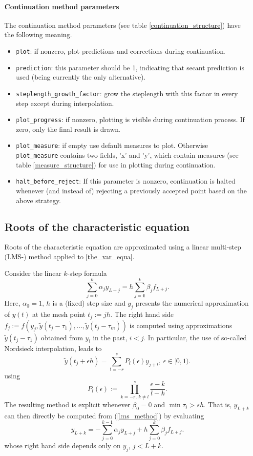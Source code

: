\documentclass[10pt]{scrartcl}
\newcommand{\defeq}{:=}
\newcommand{\blist}[1]{\mbox{\lstinline!#1!}}
\begin{document}
{\paragraph{Continuation method parameters}
The continuation method parameters (see table \ref{continuation_structure})
have the following meaning.
\begin{itemize}
\item \blist{plot}: if nonzero, plot predictions and corrections
during continuation.
\item \blist{prediction}: this parameter should be 1, indicating
that secant prediction is used (being currently the only
alternative).
\item \blist{steplength_growth_factor}: grow the steplength with
this factor in every step except during interpolation.
\item \blist{plot_progress}: if nonzero, plotting is visible during
  continuation process. If zero, only the final result is drawn.
\item \blist{plot_measure}: if empty use default measures to plot.
  Otherwise \blist{plot_measure} contains two fields, 'x' and 'y',
  which contain measures (see table \ref{measure_structure}) for use
  in plotting during continuation.
\item \blist{halt_before_reject}: If this parameter is nonzero,
continuation is halted whenever (and instead of) rejecting a
previously accepted point based on the above strategy.
\end{itemize}

\subsection{Roots of the characteristic equation}\label{root_char_equa_gio_label}
Roots of the characteristic equation are approximated using a linear
multi-step (LMS-) method applied to \eqref{the_var_equa}.

Consider the linear $k$-step formula
\begin{equation}\label{lms_method}
\sum_{j=0}^k\alpha_j y_{L+j}=h\sum_{j=0}^k\beta_j f_{L+j}.
\end{equation}
Here, $\alpha_0=1$, $h$ is a (fixed) step size and 
$y_j$ presents the numerical approximation of $y(t)$ at the mesh
point $t_j\defeq jh$.
The right hand side
$f_j\defeq f(y_j,\tilde{y}(t_j-\tau_1),\ldots,\tilde{y}(t_j-\tau_m))$ 
is computed using approximations $\tilde{y}(t_j-\tau_1)$ 
obtained from $y_i$ in the past, $i<j$.
In particular, the use of so-called Nordsieck interpolation, leads to
\begin{equation}\label{past_terms}
\tilde{y}(t_j+\epsilon h)=\sum_{l=-r}^s P_l(\epsilon)y_{j+l},\ \epsilon \in [0,1).
\end{equation}
using
\[
P_l(\epsilon)\defeq\prod_{k=-r,\,k\neq l}^s\frac{\epsilon-k}{l-k}.
\]
The resulting method is explicit whenever $\beta_0=0$ and 
$\min{\tau_i}>sh$.
That is, $y_{L+k}$ can then directly be computed from (\ref{lms_method})
by evaluating
\[
y_{L+k}=-\sum_{j=0}^{k-1}\alpha_j y_{L+j}+h\sum_{j=0}^k\beta_j f_{L+j}.
\]
whose right hand side depends only on $y_j$, $j<L+k$.

}
\end{document}
